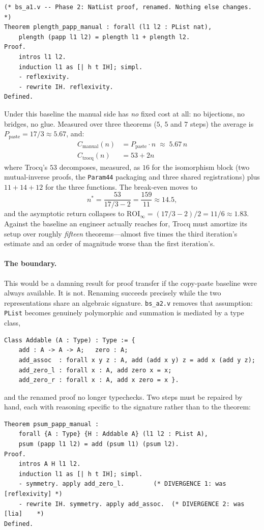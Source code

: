 \documentclass[runningheads]{llncs}
\begin{document}
\begin{lstlisting}
(* bs_a1.v -- Phase 2: NatList proof, renamed. Nothing else changes. *)
Theorem plength_papp_manual : forall (l1 l2 : PList nat),
    plength (papp l1 l2) = plength l1 + plength l2.
Proof.
    intros l1 l2.
    induction l1 as [| h t IH]; simpl.
    - reflexivity.
    - rewrite IH. reflexivity.
Defined.
\end{lstlisting}

Under this baseline the manual side has \emph{no} fixed cost at all: no
bijections, no bridges, no glue. Measured over three theorems ($5$, $5$ and
$7$ steps) the average is $P_{\text{paste}} = 17/3 \approx 5.67$, and:
\begin{align}
C_{\text{manual}}(n) &= P_{\text{paste}}\cdot n \;\approx\; 5.67\,n \\
C_{\text{trocq}}(n)  &= 53 + 2n
\end{align}
where Trocq's $53$ decomposes, measured, as $16$ for the isomorphism block
(two mutual-inverse proofs, the \texttt{Param44} packaging and three shared
registrations) plus $11+14+12$ for the three functions. The break-even moves
to
\begin{equation}
n^{*} = \frac{53}{17/3 - 2} = \frac{159}{11} \approx 14.5 ,
\end{equation}
and the asymptotic return collapses to
$\mathrm{ROI}_{\infty} = (17/3-2)/2 = 11/6 \approx 1.83$. Against the
baseline an engineer actually reaches for, Trocq must amortize its setup over
roughly \emph{fifteen} theorems---almost five times the third iteration's estimate
and an order of magnitude worse than the first iteration's.

\paragraph{The boundary.} This would be a damning result for proof transfer
if the copy-paste baseline were always available. It is not. Renaming
succeeds precisely while the two representations share an algebraic
signature. \texttt{bs\_a2.v} removes that assumption: \texttt{PList} becomes
genuinely polymorphic and summation is mediated by a type class,
\begin{lstlisting}
Class Addable (A : Type) : Type := {
    add : A -> A -> A;   zero : A;
    add_assoc  : forall x y z : A, add (add x y) z = add x (add y z);
    add_zero_l : forall x : A, add zero x = x;
    add_zero_r : forall x : A, add x zero = x }.
\end{lstlisting}
and the renamed proof no longer typechecks. Two steps must be repaired by
hand, each with reasoning specific to the signature rather than to the
theorem:
\begin{lstlisting}
Theorem psum_papp_manual :
    forall {A : Type} {H : Addable A} (l1 l2 : PList A),
    psum (papp l1 l2) = add (psum l1) (psum l2).
Proof.
    intros A H l1 l2.
    induction l1 as [| h t IH]; simpl.
    - symmetry. apply add_zero_l.        (* DIVERGENCE 1: was [reflexivity] *)
    - rewrite IH. symmetry. apply add_assoc.  (* DIVERGENCE 2: was [lia]    *)
Defined.
\end{lstlisting}
\end{document}
